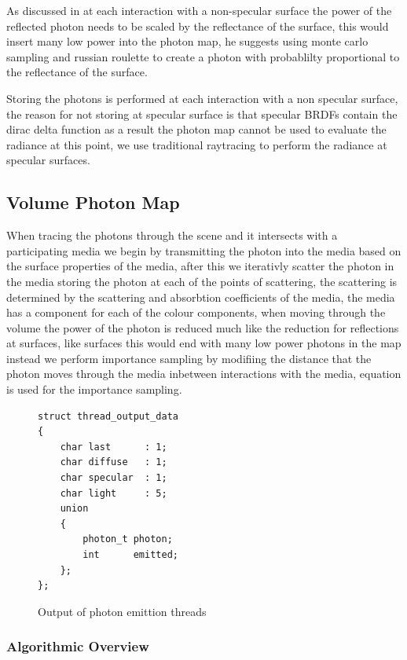 As discussed in  at each interaction with a non-specular surface the power of the reflected photon
needs to be scaled by the reflectance of the surface, this would insert many low power into the photon map, he suggests
using monte carlo sampling and russian roulette to create a photon with probablilty proportional to the reflectance
of the surface.

Storing the photons is performed at each interaction with a non specular surface, the reason for not storing at specular
surface is that specular BRDFs contain the dirac delta function as a result the photon map cannot be used to evaluate the
radiance at this point, we use traditional raytracing to perform the radiance at specular surfaces.

\subsection{Volume Photon Map}
When tracing the photons through the scene and it intersects with a participating media we begin by transmitting the
photon into the media based on the surface properties of the media, after this we iterativly scatter the photon in the
media storing the photon at each of the points of scattering, the scattering is determined by the scattering and
absorbtion coefficients of the media, the media has a component for each of the colour components, when moving through
the volume the power of the photon is reduced much like the reduction for reflections at surfaces, like surfaces this
would end with many low power photons in the map instead we perform importance sampling by modifiing the distance that
the photon moves through the media inbetween interactions with the media, equation 
is used for the importance sampling.



\begin{figure}
\begin{lstlisting}
struct thread_output_data
{
	char last      : 1;
	char diffuse   : 1;
	char specular  : 1;
	char light     : 5;
	union
	{
		photon_t photon;
		int      emitted;
	};
};
\end{lstlisting}
\caption{Output of photon emittion threads}
\end{figure}

\subsubsection{Algorithmic Overview}

